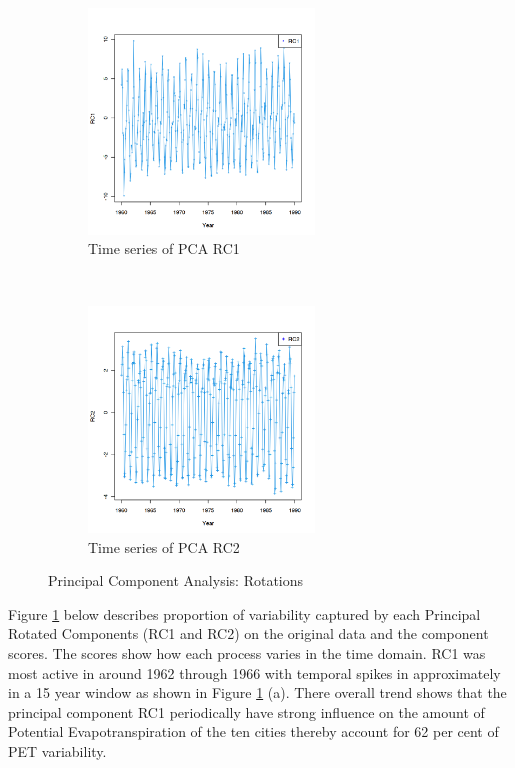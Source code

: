 \documentclass[12pt,a4paper]{article}
\begin{document}
\begin{figure}[!h]
    \centering
    \begin{subfigure}[t]{0.5\textwidth}
        \centering
        \includegraphics[width=\textwidth,height=170pt]{./gaphics/q002_e.png}
        \caption{Time series of PCA RC1} 
    \end{subfigure}%
    ~ 
    \begin{subfigure}[t]{0.5\textwidth}
        \centering
        \includegraphics[width=\textwidth,height=170pt]{./gaphics/q002_e2.png}
        \caption{Time series of PCA RC2} 
    \end{subfigure}
    \caption{Principal Component Analysis: Rotations}
    \label{fig:time_series}
\end{figure}


Figure  \ref{fig:time_series} below describes proportion of variability captured by each Principal  Rotated Components (RC1 and RC2) on the
original data and the component scores.  The scores show how each process varies in the time domain.  RC1 was most active in around 1962 through 1966 with temporal spikes in approximately in a 15 year window as shown in Figure  \ref{fig:time_series} (a). There overall trend shows that the principal component RC1 periodically have strong influence on the amount of Potential Evapotranspiration of the ten cities thereby account for 62 per cent of PET variability.
\end{document}
